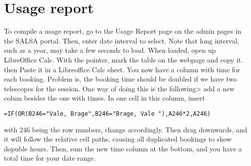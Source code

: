 \section{Usage report}
To compile a usage report, go to the Usage Report page on the admin pages in the
SALSA portal. Then, enter date interval to select. Note that long interval, such as a year,
may take a few seconds to load. When loaded, open up LibreOffice Calc. 
With the pointer, mark the table on the webpage and copy it. then
Paste it in a Libreoffice Calc sheet. 
You now have a column with time for each booking. Problem is, the booking
time should be doubled if we have two telescopes for the session. One 
way of doing this is the following> add a new colum besides the one with times.
In one cell in this column, insert
\begin{verbatim}
=IF(OR(B246="Vale, Brage",B246="Brage, Vale "),A246*2,A246)
\end{verbatim}
with 246 being the row numbers, change accordingly.
Then drag downwards, and it will follow the relative cell paths,
causing all duplicated bookings to show dopuble hours. Then, sum
the new time column at the bottom, and you have a total time
for your date range.
